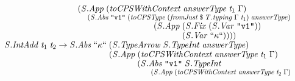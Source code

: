 \documentclass[10pt]{article}
\newcommand{\Conid}[1]{\mathit{#1}}
\newcommand{\Varid}[1]{\mathit{#1}}
\begin{document}
\begin{hscode}
${\hskip1.00em\relax\hskip1.00em\relax\hskip1.00em\relax\hskip1.00em\relax\hskip2.00em\relax\phantom{\Conid{\Conid{S}.Abs}\;\text{``}\kappa\text{``}\;\mbox{}}(\Conid{\Conid{S}.App}\;(\Varid{toCPSWithContext}\;\Varid{answerType}\;\Varid{t}_{1}\;\Gamma)\;}$\\
${\hskip1.00em\relax\hskip1.00em\relax\hskip1.00em\relax\hskip1.00em\relax\hskip2.00em\relax\phantom{\Conid{\Conid{S}.Abs}\;\text{``}\kappa\text{``}\;\mbox{}}\phantom{(\Conid{\Conid{S}.App}\;\mbox{}}(\Conid{\Conid{S}.Abs}\;\text{\tt \char34 v1\char34}\;(\Varid{toCPSType}\;(\Varid{fromJust}\mathbin{\$}\Varid{\Conid{T}.typing}\;\Gamma\;\Varid{t}_{1})\;\Varid{answerType})\;}$\\
${\hskip1.00em\relax\hskip1.00em\relax\hskip1.00em\relax\hskip1.00em\relax\hskip2.00em\relax\phantom{\Conid{\Conid{S}.Abs}\;\text{``}\kappa\text{``}\;\mbox{}}\phantom{(\Conid{\Conid{S}.App}\;\mbox{}}\phantom{(\Conid{\Conid{S}.Abs}\;\text{\tt \char34 v1\char34}\;\mbox{}}(\Conid{\Conid{S}.App}\;(\Conid{\Conid{S}.Fix}\;(\Conid{\Conid{S}.Var}\;\text{\tt \char34 v1\char34}))\;}$\\
${\hskip1.00em\relax\hskip1.00em\relax\hskip1.00em\relax\hskip1.00em\relax\hskip2.00em\relax\phantom{\Conid{\Conid{S}.Abs}\;\text{``}\kappa\text{``}\;\mbox{}}\phantom{(\Conid{\Conid{S}.App}\;\mbox{}}\phantom{(\Conid{\Conid{S}.Abs}\;\text{\tt \char34 v1\char34}\;\mbox{}}\phantom{(\Conid{\Conid{S}.App}\;\mbox{}}(\Conid{\Conid{S}.Var}\;\text{``}\kappa\text{``}))))}$\\
${\hskip1.00em\relax\hskip1.00em\relax\Conid{\Conid{S}.IntAdd}\;\Varid{t}_{1}\;\Varid{t}_{2}\to \Conid{\Conid{S}.Abs}\;\text{``}\kappa\text{``}\;(\Conid{\Conid{S}.TypeArrow}\;\Conid{\Conid{S}.TypeInt}\;\Varid{answerType})\;}$\\
${\hskip1.00em\relax\hskip1.00em\relax\phantom{\Conid{\Conid{S}.IntAdd}\;\Varid{t}_{1}\;\Varid{t}_{2}\to \Conid{\Conid{S}.Abs}\;\text{``}\kappa\text{``}\;\mbox{}}(\Conid{\Conid{S}.App}\;(\Varid{toCPSWithContext}\;\Varid{answerType}\;\Varid{t}_{1}\;\Gamma)\;}$\\
${\hskip1.00em\relax\hskip1.00em\relax\phantom{\Conid{\Conid{S}.IntAdd}\;\Varid{t}_{1}\;\Varid{t}_{2}\to \Conid{\Conid{S}.Abs}\;\text{``}\kappa\text{``}\;\mbox{}}\phantom{(\Conid{\Conid{S}.App}\;\mbox{}}(\Conid{\Conid{S}.Abs}\;\text{\tt \char34 v1\char34}\;\Conid{\Conid{S}.TypeInt}\;}$\\
${\hskip1.00em\relax\hskip1.00em\relax\phantom{\Conid{\Conid{S}.IntAdd}\;\Varid{t}_{1}\;\Varid{t}_{2}\to \Conid{\Conid{S}.Abs}\;\text{``}\kappa\text{``}\;\mbox{}}\phantom{(\Conid{\Conid{S}.App}\;\mbox{}}\phantom{(\Conid{\Conid{S}.Abs}\;\text{\tt \char34 v1\char34}\;\mbox{}}(\Conid{\Conid{S}.App}\;(\Varid{toCPSWithContext}\;\Varid{answerType}\;\Varid{t}_{2}\;\Gamma)\;}$\\

\end{hscode}
\end{document}

